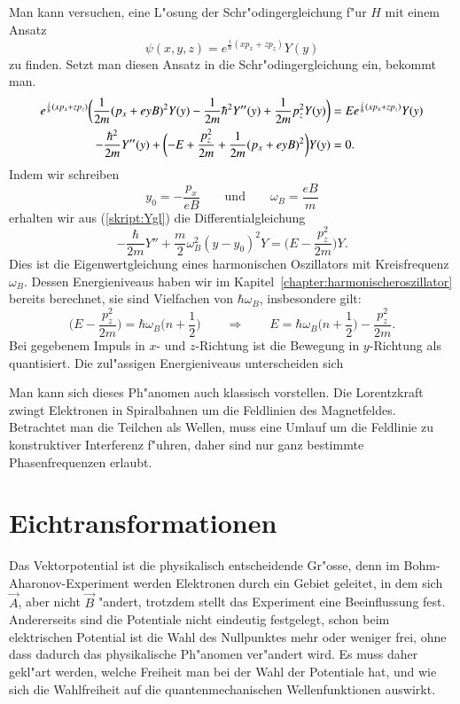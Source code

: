 Man kann versuchen, eine L"osung der Schr"odingergleichung f"ur $H$ mit
einem Ansatz
\[
\psi(x,y,z)
=
e^{\frac{i}{\hbar}(xp_x+zp_z)}Y(y)
\]
zu finden.
Setzt man diesen Ansatz in die Schr"odingergleichung ein, bekommt man.
\begin{align}
e^{\frac{i}{\hbar}(xp_x+zp_z)}
\biggl(
\frac1{2m}
(p_x+eyB)^2
Y(y)
-
\frac1{2m}
\hbar^2 Y''(y)
+
\frac1{2m}p_z^2
Y(y)
\biggr)
&=
E
e^{\frac{i}{\hbar}(xp_x+zp_z)}
Y(y)
\notag
\\
-\frac{\hbar^2}{2m} Y''(y)
+
\biggl(
-E
+
\frac{ p_z^2}{2m}
+
\frac1{2m}
(p_x+eyB)^2
\biggr)
Y(y)
&=
0.
\label{skript:Ygl}
\end{align}
Indem wir schreiben
\[
y_0=-\frac{p_x}{eB}
\qquad
\text{und}
\qquad
\omega_B
=\frac{eB}{m}
\]
erhalten wir aus (\ref{skript:Ygl}) die Differentialgleichung
\begin{equation}
-\frac{\hbar}{2m}Y''
+\frac{m}2\omega_B^2(y-y_0)^2Y
=
\biggl(E-\frac{p_z^2}{2m}\biggr) Y.
\label{skript:landauniveaus}
\end{equation}
Dies ist die Eigenwertgleichung eines harmonischen Oszillators mit
Kreisfrequenz $\omega_B$.
Dessen Energieniveaus haben wir im Kapitel~\ref{chapter:harmonischeroszillator}
bereits berechnet, sie sind Vielfachen von $\hbar\omega_B$, insbesondere
gilt:
\[
\biggl(E-\frac{p_z^2}{2m}\biggr) = \hbar\omega_B\biggl(n+\frac12\biggr)
\qquad\Rightarrow\qquad
E=
\hbar\omega_B\biggl(n+\frac12\biggr)
-
\frac{p_z^2}{2m}.
\]
Bei gegebenem Impuls in $x$- und $z$-Richtung ist die Bewegung in
$y$-Richtung als quantisiert.
Die zul"assigen Energieniveaus unterscheiden sich 

Man kann sich dieses Ph"anomen auch klassisch vorstellen.
Die Lorentzkraft zwingt Elektronen in Spiralbahnen um die Feldlinien des
Magnetfeldes.
Betrachtet man die Teilchen als Wellen, muss eine Umlauf um die
Feldlinie zu konstruktiver Interferenz f"uhren, daher sind nur
ganz bestimmte Phasenfrequenzen erlaubt.

%
%
\section{Eichtransformationen\label{section:eichtransformation}}
Das Vektorpotential ist die physikalisch entscheidende Gr"osse,
denn im Bohm-Aharonov-Experiment
werden Elektronen durch ein Gebiet geleitet, in dem sich $\vec A$,
aber nicht $\vec B$ "andert, trotzdem stellt das Experiment eine
Beeinflussung fest.
Andererseits sind die Potentiale nicht eindeutig festgelegt, schon
beim elektrischen Potential ist die Wahl des Nullpunktes mehr oder
weniger frei, ohne dass dadurch das physikalische Ph"anomen ver"andert
wird.
Es muss daher gekl"art werden, welche Freiheit man bei der Wahl
der Potentiale hat, und wie sich die Wahlfreiheit auf die quantenmechanischen
Wellenfunktionen auswirkt.

